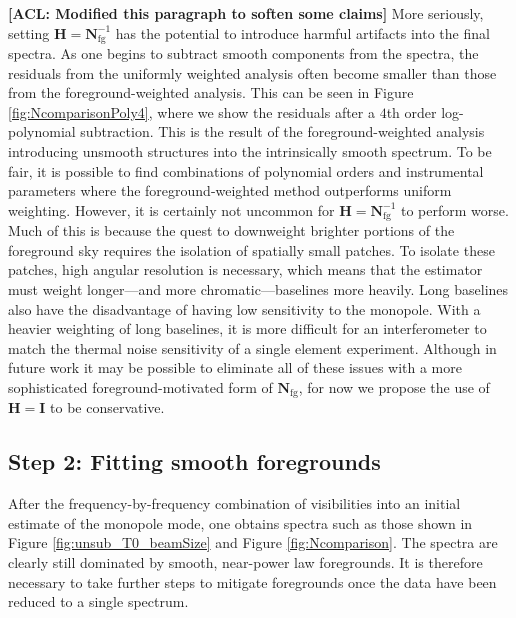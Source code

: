 \documentclass[twocolumn,apj,numberedappendix]{emulateapj}
\newcommand{\Hmat}{\mathbf{H}}
\newcommand{\Nfg}{\mathbf{N}_{\textrm{fg}}}
\newcommand{\acl}[1]{{\color{red} \textbf{[ACL:  #1]}}}
\begin{document}
\acl{Modified this paragraph to soften some claims} More seriously, setting $\Hmat = \Nfg^{-1}$ has the potential to introduce harmful artifacts into the final spectra. As one begins to subtract smooth components from the spectra, the residuals from the uniformly weighted analysis often become smaller than those from the foreground-weighted analysis. This can be seen in Figure \ref{fig:NcomparisonPoly4}, where we show the residuals after a $4$th order log-polynomial subtraction. This is the result of the foreground-weighted analysis introducing unsmooth structures into the intrinsically smooth spectrum. To be fair, it is possible to find combinations of polynomial orders and instrumental parameters where the foreground-weighted method outperforms uniform weighting. However, it is certainly not uncommon for $\Hmat = \Nfg^{-1}$ to perform worse. Much of this is because the quest to downweight brighter portions of the foreground sky requires the isolation of spatially small patches. To isolate these patches, high angular resolution is necessary, which means that the estimator must weight longer---and more chromatic---baselines more heavily. Long baselines also have the disadvantage of having low sensitivity to the monopole. With a heavier weighting of long baselines, it is more difficult for an interferometer to match the thermal noise sensitivity of a single element experiment. Although in future work it may be possible to eliminate all of these issues with a more sophisticated foreground-motivated form of $\Nfg$, for now we propose the use of $\Hmat = \mathbf{I}$ to be conservative.

\subsection{Step 2: Fitting smooth foregrounds}
\label{sec:fitting}
After the frequency-by-frequency combination of visibilities into an initial estimate of the monopole mode, one obtains spectra such as those shown in Figure \ref{fig:unsub_T0_beamSize} and Figure \ref{fig:Ncomparison}. The spectra are clearly still dominated by smooth, near-power law foregrounds. It is therefore necessary to take further steps to mitigate foregrounds once the data have been reduced to a single spectrum.
\end{document}
